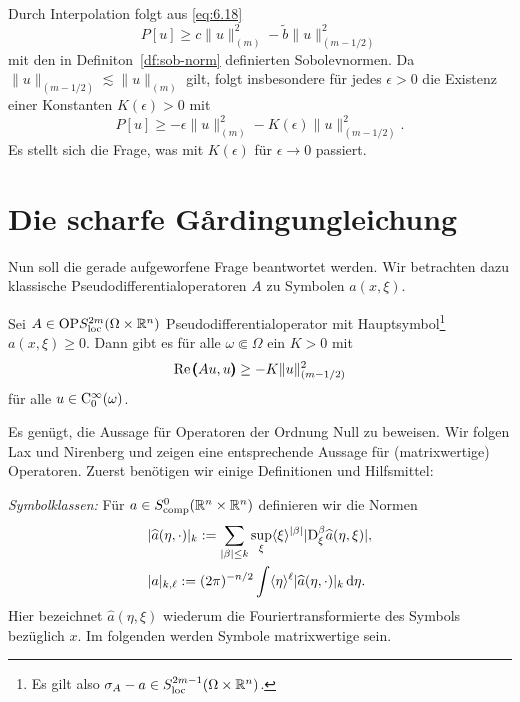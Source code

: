 \begin{rem} 
Durch Interpolation folgt aus \eqref{eq:6.18}
\begin{equation}
P[u] \ge c \|u\|_{(m)}^2 - \tilde b \|u\|_{(m-1/2)}^2
\end{equation}
mit den in Definiton~\ref{df:sob-norm} definierten Sobolevnormen. Da $\|u\|_{(m-1/2)} \lesssim \|u\|_{(m)}$ gilt, folgt insbesondere für jedes $\epsilon>0$
die Existenz einer Konstanten $K(\epsilon)>0$ mit
\begin{equation}
P[u] \ge -\epsilon \|u\|_{(m)}^2 - K(\epsilon) \|u\|_{(m-1/2)}^2.
\end{equation}
Es stellt sich die Frage, was mit $K(\epsilon)$ für $\epsilon\to0$ passiert. 
\end{rem}

\section{Die scharfe G\r{a}rdingungleichung}

Nun soll die gerade aufgeworfene Frage beantwortet werden. Wir betrachten dazu klassische Pseudodifferentialoperatoren $A$ zu Symbolen $a(x,\xi)$.

\begin{thm}
Sei $A\in {\rm OP}S^{2m}_{\rm loc}(\Omega\times\mathbb R^n)$ Pseudodifferentialoperator mit Hauptsymbol\footnote{Es gilt also $\sigma_A-a\in S^{2m-1}_{\rm loc}(\Omega\times\mathbb R^n)$.} $a(x,\xi)\ge0$. Dann gibt es  für alle $\omega\Subset \Omega$ ein $K>0$ mit
 \begin{equation}
    \operatorname{Re} \pmb(Au,u\pmb) \ge - K \|u\|_{(m-1/2)}^2 
 \end{equation}
 für alle $u\in\mathrm C_0^\infty(\omega)$.
\end{thm}

Es genügt, die Aussage für Operatoren der Ordnung Null zu beweisen. Wir folgen Lax und Nirenberg \cite{Lax:1966} und zeigen eine entsprechende Aussage für (matrixwertige) Operatoren. Zuerst benötigen wir einige Definitionen und Hilfsmittel:

{\em Symbolklassen:} Für $ a\in S^0_{\rm comp}(\mathbb R^n\times\mathbb R^n)$ definieren wir die Normen
\begin{align}
&	\vert \widehat{a}(\eta,\cdot)\vert_k := \sum\limits_{\vert \beta\vert \le k} \sup\limits_{\xi} \langle \xi\rangle^{\vert \beta\vert}\vert\mathrm D_\xi^\beta  \widehat{a}(\eta,\xi)\vert,\\
&   | a|_{k,\ell} := (2\pi)^{-n/2} \int \langle\eta\rangle^\ell   \vert \widehat{a}(\eta,\cdot)\vert_k \,\mathrm d \eta.
\end{align}
Hier bezeichnet $\widehat a(\eta,\xi)$ wiederum die Fouriertransformierte des Symbols bezüglich $x$. Im folgenden werden Symbole matrixwertige sein.


